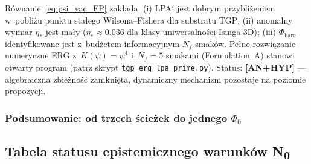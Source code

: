 \begin{uwaga}
\label{rem:phi0_erg_status}
Równanie~\eqref{eq:psi_vac_FP} zakłada:
(i) LPA$'$ jest dobrym przybliżeniem w~pobliżu punktu
stałego Wilsona--Fishera dla substratu TGP;
(ii) anomalny wymiar $\eta_*$ jest mały ($\eta_* \approx 0.036$
dla klasy uniwersalności Isinga 3D);
(iii) $\Phi_\mathrm{bare}$ identyfikowane jest z~budżetem
informacyjnym $N_f$ smaków.
Pełne rozwiązanie numeryczne ERG z~$K(\psi) = \psi^4$
i~$N_f = 5$ smakami (Formulation~A) stanowi otwarty program
(patrz skrypt \texttt{tgp\_erg\_lpa\_prime.py}).
Status: \textbf{[AN+HYP]} --- algebraiczna zbieżność zamknięta,
dynamiczny mechanizm pozostaje na poziomie propozycji.
\end{uwaga}

\subsubsection{Podsumowanie: od trzech ścieżek do jednego $\Phi_0$}

\begin{center}
\end{center}

\subsection{Tabela statusu epistemicznego warunków N\textsubscript{0}}
\label{subsec:N0_status_table}

